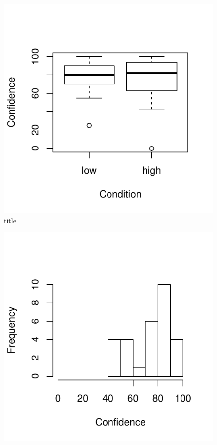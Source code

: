 \begin{figure}
  \centering
   \includegraphics{images/indConfChallengesBoxplot-1}
  \caption{title}
  \label{fig:indConfChallengesBoxplot}
\end{figure}




\begin{figure}
  \centering
  \includegraphics{images/histHighGroupConfidence-1}
  \label{fig:groupConfChallengesBoxplot}
\end{figure}

